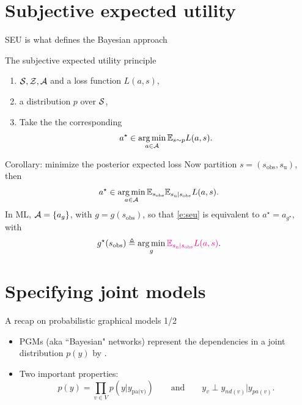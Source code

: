 \documentclass[10pt]{beamer}
\begin{document}
\section{Subjective expected utility}
\begin{frame}{SEU is what defines the Bayesian approach}
\begin{block}{The subjective expected utility principle}
\begin{enumerate}
\item {} $\mathcal{S}, \mathcal{Z}, \mathcal{A}$ and a loss function $L(a,s)$,
\item {} a distribution $p$ over $\mathcal{S}$,
\item Take the the corresponding 
\begin{equation}
a^\star \in \operatorname*{arg\,min}_{a\in\mathcal{A}} \mathbb{E}_{s\sim p} L(a,s).
\label{e:seu}
\end{equation}
\end{enumerate}
\end{block}
\vfill

\begin{block}{Corollary: minimize the posterior expected loss}
Now partition $s=(s_{\text{obs}}, s_{\text{u}})$, then 
$$ a^\star \in \operatorname*{arg\,min}_{a\in\mathcal{A}} \mathbb{E}_{s_{\text{obs}}} \mathbb{E}_{s_{\text{u}}\vert s_{\text{obs}}} L(a,s).$$
In ML, $\mathcal{A} = \{a_g\}$, with $g = g(s_\text{obs})$, so that
\eqref{e:seu} is equivalent to $a^\star = a_{g^\star}$, with
$$
g^\star (s_\text{obs}) \triangleq \operatorname*{arg\,min}_{g} \textcolor{magenta}{\mathbb{E}_{s_{\text{u}}\vert s_{\text{obs}}} L(a,s)}.$$
\end{block}
\end{frame}

\section{Specifying joint models}
\begin{frame}{A recap on probabilistic graphical models 1/2}
  \begin{itemize}
    \item PGMs (aka ``Bayesian" networks) represent the dependencies in a joint distribution $p(y)$ by .
    \item Two important properties:
    $$
    p(y) = \prod_{v\in V} p(y\vert y_{\text{pa(v)}}) \qquad\text{and}\qquad
    y_v \perp y_{nd(v)} \vert y_{pa(v)}.
    $$
    \blank
  \end{itemize}
  \blank
\end{frame}
\end{document}
